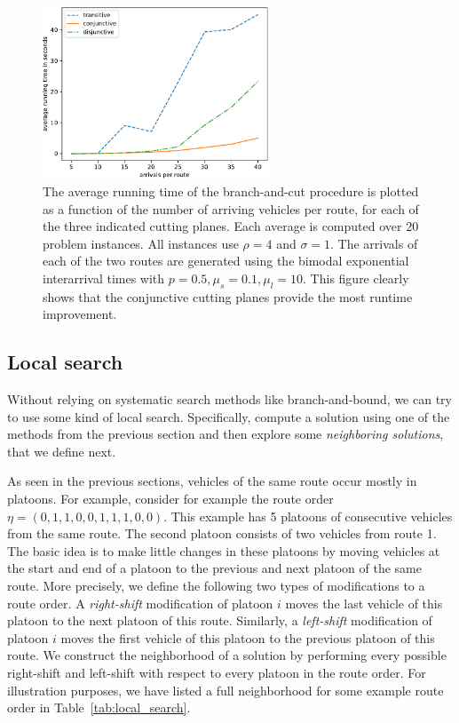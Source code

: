 \documentclass[a4paper]{report}
\theoremstyle{definition}
\theoremstyle{plain}
\begin{document}
\begin{figure}
  \centering
  \includegraphics[width=0.6\textwidth]{data-single/running_times.pdf}
  \caption{The average running time of the branch-and-cut procedure is plotted
    as a function of the number of arriving vehicles per route, for each of the
    three indicated cutting planes. Each average is computed over $20$ problem
    instances. All instances use $\rho = 4$ and $\sigma = 1$. The arrivals of each of
    the two routes are generated using the bimodal exponential interarrival
    times with $p=0.5, \mu_{s} = 0.1, \mu_{l} = 10$. This figure clearly shows that
    the conjunctive cutting planes provide the most runtime improvement.}
  \label{fig:running_time}
\end{figure}

\subsection{Local search}
\label{sec:local_search}

Without relying on systematic search methods like branch-and-bound, we can try
to use some kind of local search. Specifically, compute a solution using one of
the methods from the previous section and then explore some \textit{neighboring
  solutions}, that we define next.

As seen in the previous sections, vehicles of the same route occur mostly in
platoons. For example, consider for example the route order
$\eta = (0, 1, 1, 0, 0, 1, 1, 1, 0, 0)$. This example has 5 platoons of consecutive
vehicles from the same route. The second platoon consists of two vehicles from
route 1.
The basic idea is to make little changes in these platoons by moving vehicles at
the start and end of a platoon to the previous and next platoon of the same
route.
%
More precisely, we define the following two types of modifications to a route
order. A \textit{right-shift} modification of platoon $i$ moves the last vehicle of this
platoon to the next platoon of this route. Similarly, a \textit{left-shift} modification
of platoon $i$ moves the first vehicle of this platoon to the previous platoon
of this route.
%
We construct the neighborhood of a solution by performing every possible
right-shift and left-shift with respect to every platoon in the route order. For
illustration purposes, we have listed a full neighborhood for some example route
order in Table~\ref{tab:local_search}.
\end{document}
